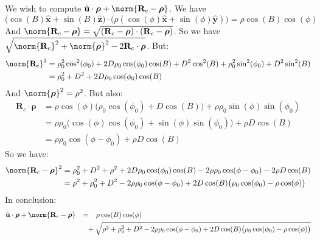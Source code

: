 \documentclass[crop=false,class=book,oneside]{standalone}
\begin{document}
            We wish to compute $\hat{\mathbf{u}}\cdot \boldsymbol{\rho}+\norm{\mathbf{R}_{c}-\boldsymbol{\rho}}$. We have
            \begin{equation*}
            \big(\cos(B)\hat{\mathbf{x}}+\sin(B)\hat{\mathbf{z}}\big)\cdot\big(\rho(\cos(\phi)\hat{\mathbf{x}}+\sin(\phi)\hat{\mathbf{y}})\big) = \rho\cos(B)\cos(\phi)
            \end{equation*}
            And $\norm{\mathbf{R}_{c}-\boldsymbol{\rho}} = \sqrt{(\mathbf{R}_{c}-\boldsymbol{\rho})\cdot(\mathbf{R}_{c}-\boldsymbol{\rho})}$. So we have $\sqrt{\norm{\mathbf{R}_{c}}^2+\norm{\boldsymbol{\rho}}^2-2\mathbf{R}_{c}\cdot\boldsymbol{\rho}}$. But:
            \begin{align*}
            \nonumber \norm{\mathbf{R}_{c}}^2 &= \rho_{0}^2\cos^2(\phi_0)+2D\rho_{0}\cos(\phi_0)\cos(B)+D^2\cos^2(B) + \rho_{0}^2\sin^2(\phi_0)+D^2\sin^2(B) \\
            &= \rho_{0}^2+D^2+2D\rho_{0}\cos(\phi_0)\cos(B)
            \end{align*}
            And $\norm{\boldsymbol{\rho}}^2 = \rho^2$. But also:
            \begin{align*}
            \nonumber \mathbf{R}_{c}\cdot \boldsymbol{\rho} &= \rho\cos(\phi)\big(\rho_{0}\cos(\phi_{0})+D\cos(B)\big)+\rho\rho_{0}\sin(\phi)\sin(\phi_{0})\\
            \nonumber &= \rho\rho_{0}\big(\cos(\phi)\cos(\phi_{0})+\sin(\phi)\sin(\phi_{0})\big)+\rho D\cos(B)\\
            &= \rho\rho_{0}\cos(\phi-\phi_{0})+\rho D\cos(B)
            \end{align*}
            So we have:
            \begin{align*}
            \nonumber \norm{\mathbf{R}_{c}-\boldsymbol{\rho}}^2 &= \rho_{0}^2+D^2+\rho^2+2D\rho_{0}\cos(\phi_{0})\cos(B)-2\rho\rho_{0}\cos(\phi-\phi_{0})-2\rho D\cos(B)\\
            &=\rho^2+\rho_{0}^2+D^2-2\rho\rho_{0}\cos(\phi-\phi_{0}) + 2D\cos(B)\big(\rho_{0}\cos(\phi_0)-\rho\cos(\phi)\big)
            \end{align*}
            In conclusion:
            \begin{align*}
                \hat{\mathbf{u}}\cdot \boldsymbol{\rho} + \norm{\mathbf{R}_{c}-\boldsymbol{\rho}} &\phantom{+}=\phantom{+}\rho\cos(B)\cos(\phi)\\
                &\phantom{+}\phantom{=}+\sqrt{\rho^2+\rho_{0}^2 + D^2 - 2\rho\rho_{0}\cos(\phi - \phi_{0}) + 2D\cos(B)\big(\rho_{0}\cos(\phi_0) - \rho\cos(\phi)\big)}
            \end{align*}
\end{document}
